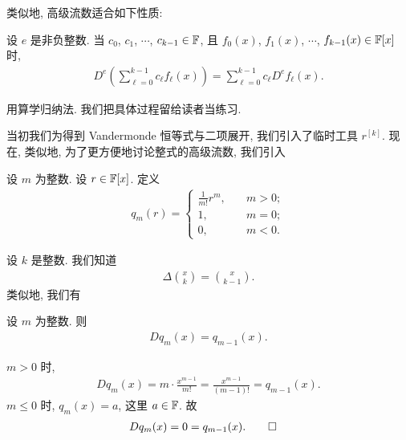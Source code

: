 类似地, 高级流数适合如下性质:

\begin{proposition}
    设 $e$ 是非负整数. 当 $c_0$, $c_1$, $\cdots$, $c_{k-1} \in \mathbb{F}$, 且 $f_0 (x)$, $f_1 (x)$, $\cdots$, $f_{k-1} (x) \in \mathbb{F}[x]$ 时,
    \begin{align*}
        D^e \left( \sum_{\ell = 0}^{k-1} c_\ell f_\ell (x) \right)
        = \sum_{\ell = 0}^{k-1} c_\ell D^e f_\ell (x).
    \end{align*}
\end{proposition}

\begin{pf}
    用算学归纳法. 我们把具体过程留给读者当练习.
\end{pf}

当初我们为得到 Vandermonde 恒等式与二项展开, 我们引入了临时工具 $r^{[k]}$. 现在, 类似地, 为了更方便地讨论整式的高级流数, 我们引入

\begin{definition}
    设 $m$ 为整数. 设 $r \in \mathbb{F}[x]$. 定义
    \begin{align*}
        q_m (r) = \begin{cases}
            \frac{1}{m!} r^m, & \quad m > 0; \\
            1,                & \quad m = 0; \\
            0,                & \quad m < 0.
        \end{cases}
    \end{align*}
\end{definition}

设 $k$ 是整数. 我们知道
\begin{align*}
    \Delta \binom{x}{k} = \binom{x}{k - 1}.
\end{align*}
类似地, 我们有

\begin{proposition}
    设 $m$ 为整数. 则
    \begin{align*}
        D q_m (x) = q_{m-1} (x).
    \end{align*}
\end{proposition}

\begin{pf}
    $m > 0$ 时,
    \begin{align*}
        D q_m (x) = m \cdot \frac{x^{m-1}}{m!} = \frac{x^{m-1}}{(m-1)!} = q_{m-1} (x).
    \end{align*}
    $m \leq 0$ 时, $q_m (x) = a$, 这里 $a \in \mathbb{F}$. 故
    \begin{align*}
         & D q_m (x) = 0 = q_{m-1} (x). \qedhere
    \end{align*}
\end{pf}

